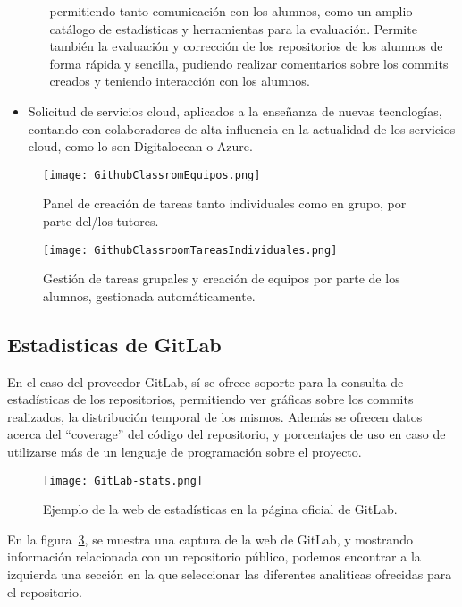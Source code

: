 \begin{itemize}
\begin{itemize}
    permitiendo tanto comunicación con los alumnos, como un amplio catálogo
    de estadísticas y herramientas para la evaluación. Permite también la
    evaluación y corrección de los repositorios de los alumnos de forma
    rápida y sencilla, pudiendo realizar comentarios sobre los commits
    creados y teniendo interacción con los alumnos.
  \end{itemize}
\item Solicitud de servicios cloud, aplicados a la enseñanza de nuevas
  tecnologías, contando con colaboradores de alta influencia en la
  actualidad de los servicios cloud, como lo son Digitalocean o Azure.
\end{itemize}

\begin{figure}[h!]
  \texttt{[image: GithubClassromEquipos.png]}
  \caption{Panel de creación de tareas tanto individuales como en grupo,
    por parte del/los tutores.}
  \label{figure:GitHubClassroomTareas}
\end{figure}
\begin{figure}[h!]
  \texttt{[image: GithubClassroomTareasIndividuales.png]}
  \caption{Gestión de tareas grupales y creación de equipos por parte de
    los alumnos, gestionada automáticamente.}
  \label{figure:GitHubClassroomEquipos}
\end{figure}


\subsection{Estadisticas de GitLab}

En el caso del proveedor GitLab, sí se ofrece soporte para la consulta de
estadísticas de los repositorios, permitiendo ver gráficas sobre los
commits realizados, la distribución temporal de los mismos. Además se
ofrecen datos acerca del ``coverage'' del código del repositorio, y
porcentajes de uso en caso de utilizarse más de un lenguaje de programación
sobre el proyecto.

\begin{figure}[h!]
  \texttt{[image: GitLab-stats.png]}
  \caption{Ejemplo de la web de estadísticas en la página oficial de
    GitLab.}
  \label{figure:GitLabInsights}
\end{figure}

En la figura~\ref{figure:GitLabInsights}, se muestra una captura de la web
de GitLab, y mostrando información relacionada con un repositorio público,
podemos encontrar a la izquierda una sección en la que seleccionar las
diferentes analiticas ofrecidas para el repositorio.

